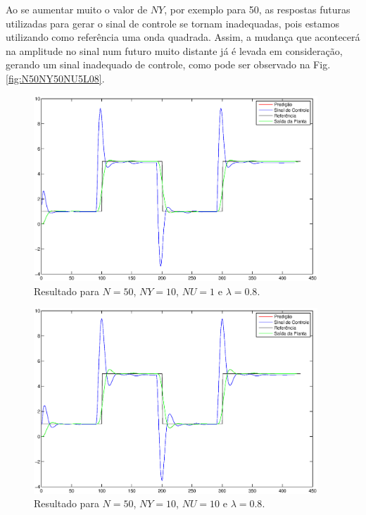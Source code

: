 Ao se aumentar muito o valor de $NY$, por exemplo para 50, as respostas futuras
utilizadas para gerar o sinal de controle se tornam inadequadas, pois estamos
utilizando como referência uma onda quadrada. Assim, a mudança que acontecerá na
amplitude no sinal num futuro muito distante já é levada em consideração,
gerando um sinal inadequado de controle, como pode ser observado na Fig.
\ref{fig:N50NY50NU5L08}.

\begin{figure}[htb]
\centering
    \includegraphics[width=0.95\textwidth]{imgs/questao1/N50NY10NU1L07}
    \caption{Resultado para $N = 50$, $NY = 10$, $NU = 1$ e $\lambda = 0.8$.}
    \label{fig:N50NY10NU1L07}
\end{figure}

\begin{figure}[htb]
\centering
    \includegraphics[width=0.95\textwidth]{imgs/questao1/N50NY10NU10L08}
    \caption{Resultado para $N = 50$, $NY = 10$, $NU = 10$ e $\lambda = 0.8$.}
    \label{fig:N50NY10NU10L08}
\end{figure}

